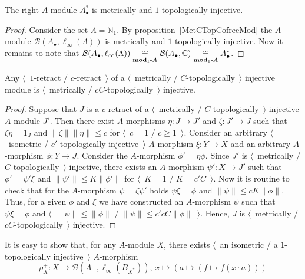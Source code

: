 \begin{proposition}\label{DualOfUnitalAlgIsMetTopInj} The right $A$-module
$A_\bullet^*$ is metrically and $1$-topologically injective.
\end{proposition}
\begin{proof} Consider the set $\Lambda=\mathbb{N}_1$. 
By proposition~\ref{MetCTopCofreeMod} the 
$A$-module $\mathcal{B}(A_\bullet, \ell_\infty(\Lambda))$ is metrically 
and $1$-topologically injective. Now it remains to note that 
$\mathcal{B}(A_\bullet, \ell_\infty(\Lambda))
\mathrel{\mathop{\cong}\limits_{\mathbf{mod}_1\text{-}A}}
\mathcal{B}(A_\bullet, \mathbb{C})
\mathrel{\mathop{\cong}\limits_{\mathbf{mod}_1\text{-}A}}
A_\bullet^*$.
\end{proof}

\begin{proposition}\label{RetrMetCTopInjIsMetCTopInj} Any 
$\langle$~$1$-retract / $c$-retract~$\rangle$ of a 
$\langle$~metrically / $C$-topologically~$\rangle$ injective module is
$\langle$~metrically / $c C$-topologically~$\rangle$ injective.
\end{proposition}
\begin{proof} Suppose that $J$ is a $c$-retract of a  
$\langle$~metrically / $C$-topologically~$\rangle$ injective $A$-module $J'$.
Then there exist $A$-morphisms $\eta:J\to J'$ and $\zeta: J'\to J$ such that
$\zeta\eta=1_{J}$ and $\lVert\zeta\rVert\lVert\eta\rVert\leq c$ 
for $\langle$~$c=1$ / $c\geq 1$~$\rangle$. Consider 
an arbitrary $\langle$~isometric / $c'$-topologically injective~$\rangle$ 
$A$-morphism $\xi:Y\to X$ and an arbitrary $A$-morphism $\phi:Y\to J$. 
Consider the $A$-morphism $\phi'=\eta\phi$. Since $J'$ is 
$\langle$~metrically / $C$-topologically~$\rangle$ injective, there 
exists an $A$-morphism $\psi':X\to J'$ such that $\phi'=\psi'\xi$ 
and $\lVert\psi'\rVert \leq K\lVert\phi'\rVert$ 
for $\langle$~$K=1$ / $K=c' C$~$\rangle$. Now it is routine to check that 
for the $A$-morphism $\psi=\zeta\psi'$ 
holds $\psi\xi=\phi$ and $\lVert\psi\rVert \leq cK\lVert\phi\rVert$. 
Thus, for a given $\phi$ and $\xi$ we have
constructed an $A$-morphism $\psi$ such that $\psi\xi=\phi$  and
$\langle$~$\lVert\psi\rVert\leq\lVert\phi\rVert$ / 
$\lVert \psi\rVert\leq c' c C\lVert\phi\rVert$~$\rangle$. Hence, $J$ 
is $\langle$~metrically / $c C$-topologically~$\rangle$ injective.
\end{proof}


It is easy to show that, for any $A$-module $X$, there exists 
$\langle$~an isometric / a $1$-topologically injective~$\rangle$ 
$A$-morphism
\[
\rho_X^+:
X\to\mathcal{B}(A_+, \ell_\infty(B_{X^*})),\, 
x\mapsto(a\mapsto(f\mapsto f(x\cdot a)))
\]


